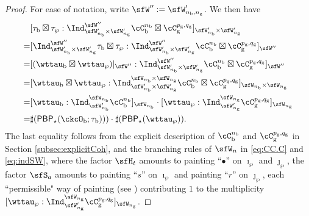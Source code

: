 \documentclass[12pt,a4paper]{amsart}
\numberwithin{equation}{section}
\theoremstyle{remark}
\def\nbb{n_{\mathrm b}}
\def\PBP{\mathsf{PBP}}
\begin{document}
\begin{proof}
  For ease of notation, write $\sfW'':=\sfW_{n_{\mathrm b},n_{\mathrm g}}'$. We then have
  \[
    \begin{split}
      & [\tau_{\mathrm b}\boxtimes \tau_{\wp} :
      \Ind_{\sfW'_{n_{\mathrm b}}\times \sfW'_{n_{\mathrm g}}}^{\sfW''} \cC_{\mathrm b}^{\nbb} \boxtimes \cC_{\mathrm g}^{p_{\mathrm g},q_{\mathrm g}}]_{\sfW'_{n_{\mathrm b}}\times \sfW'_{n_{\mathrm g}}}\\
      = & [\Ind_{\sfW'_{n_{\mathrm b}}\times \sfW'_{n_{\mathrm g}}}^{\sfW''} \tau_{\mathrm b}\boxtimes \tau_{\wp} :
      \Ind_{\sfW'_{n_{\mathrm b}}\times \sfW'_{n_{\mathrm g}}}^{\sfW''} \cC_{\mathrm b}^{\nbb} \boxtimes \cC_{\mathrm g}^{p_{\mathrm g},q_{\mathrm g}}]_{\sfW''}\\
      = & [(\wttau_{\mathrm b}\boxtimes \wttau_{\wp})|_{\sfW''}:
      \Ind_{\sfW'_{n_{\mathrm b}}\times \sfW'_{n_{\mathrm g}}}^{\sfW''} \cC_{\mathrm b}^{\nbb} \boxtimes \cC_{\mathrm g}^{p_{\mathrm g},q_{\mathrm g}}]_{\sfW''}\\
      = & [\wttau_{\mathrm b}\boxtimes \wttau_{\wp}:
      \Ind_{\sfW'_{n_{\mathrm b}}\times \sfW'_{n_{\mathrm g}}}^{\sfW_{n_{\mathrm b}}\times \sfW_{n_{\mathrm g}}} \cC_{\mathrm b}^{\nbb} \boxtimes \cC_{\mathrm g}^{p_{\mathrm g},q_{\mathrm g}}]_{\sfW_{n_{\mathrm b}}\times \sfW_{n_{\mathrm g}}}\\
       = & [\wttau_{\mathrm b}:\Ind_{\sfW'_{n_{\mathrm b}}}^{\sfW_{n_{\mathrm b}}} \cC_{\mathrm b}^{\nbb}]_{\sfW_{n_{\mathrm b}}}\cdot
           [\wttau_{\wp}:\Ind_{\sfW'_{n_{\mathrm g}}}^{\sfW_{n_{\mathrm g}}} \cC_{\mathrm g}^{p_{\mathrm g},q_{\mathrm g}}]_{\sfW_{n_{\mathrm g}}}\\
      =& \sharp(\PBP_{\star}(\ckcO_{\mathrm b}; \tau _{\mathrm b})))\cdot \sharp(\PBP_{\star}(\wttau_{\wp})).
    \end{split}
  \]
  The last equality follows from the explicit description of $\cC_{\mathrm b}^{\nbb}$ and $\cC_{\mathrm g}^{p_{\mathrm g},q_{\mathrm g}}$ in Section \ref{subsec:explicitCoh}, and
  the branching rules of $\sfW_{n}$ in \eqref{eq:CC.C} and \eqref{eq:indSW}, where the factor $\sfH_{t}$ amounts to painting ``$\bullet$'' on $\imath_{\wp}$ and $\jmath_{\wp}$, the factor $\sfS_{a}$ amounts to painting ``$s$'' on $\imath_{\wp}$ and painting ``$r$'' on $\jmath_{\wp}$, each ``permissible" way of painting (see )  
  contributing $1$ to the multiplicity $[\wttau_{\wp}:\Ind_{\sfW'_{n_{\mathrm g}}}^{\sfW_{n_{\mathrm g}}} \cC_{\mathrm g}^{p_{\mathrm g},q_{\mathrm g}}]_{\sfW_{n_{\mathrm g}}}$.
\end{proof}
\end{document}
